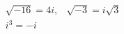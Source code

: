 \documentclass[preview]{standalone}
\begin{document}
\begin{align*}
&\sqrt{-16} = 4i, & \sqrt{-3} = i\sqrt{3} \\ &i^3 = -i
\end{align*}
\end{document}
